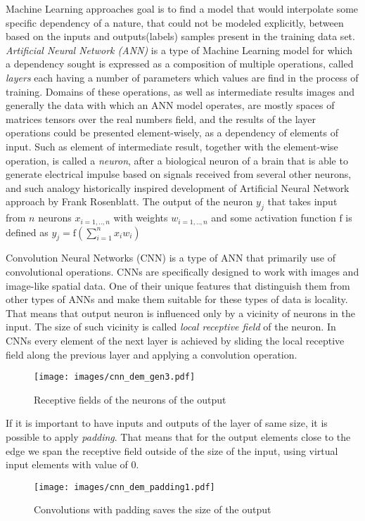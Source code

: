 Machine Learning approaches goal is to find a model that would interpolate some specific dependency of a nature, that could not be modeled explicitly, between based on the inputs and outputs(labels) samples present in the training data set.
\textit{Artificial Neural Network (ANN)} is a type of Machine Learning model for which a dependency sought is expressed as a composition of multiple operations, called \textit{layers} each having a number of parameters which values are find in the process of training.
Domains of these operations, as well as intermediate results images and generally the data with which an ANN model operates, are mostly spaces of matrices tensors over the real numbers field, and the results of the layer operations could be presented element-wisely, as a dependency of elements of input.
Such as element of intermediate result, together with the element-wise operation, is called a \textit{neuron}, after a biological neuron of a brain that is able to generate electrical impulse based on signals received from several other neurons, and such analogy historically inspired development of Artificial Neural Network approach by Frank Rosenblatt\cite{}.
The output of the neuron $y_{j}$ that takes input from $n$ neurons $x_{i=1,..,n}$ with weights $w_{i=1,..,n}$ and some activation function $\mathrm{f}$ is defined as $ y_{j}=\mathrm{f}(\sum_{i=1}^{n} x_{i}w_{i})$
\medskip
{}

Convolution Neural Networks (CNN) is a type of ANN that primarily use of convolutional operations.
CNNs are specifically designed to work with images and image-like spatial data.
One of their unique features that distinguish them from other types of ANNs and make them suitable for these types of data is locality.
That means that output neuron is influenced only by a vicinity of neurons in the input.
The size of such vicinity is called \textit{local receptive field} of the neuron.
In CNNs every element of the next layer is achieved by sliding the local receptive field along the previous layer and applying a convolution operation.
\begin{figure}
	\centering
	\texttt{[image: images/cnn\_dem\_gen3.pdf]}
	\caption{Receptive fields of the neurons of the output}
	\label{fig:rec_field_demo}
\end{figure}

If it is important to have inputs and outputs of the layer of same size, it is possible to apply \textit{padding}.
That means that for the output elements close to the edge we span the receptive field outside of the size of the input, using virtual input elements with value of $0$. 
\begin{figure}
	\centering
	\texttt{[image: images/cnn\_dem\_padding1.pdf]}
	\caption{Convolutions with padding saves the size of the output}
	\label{fig:padding_demo}
\end{figure}
\medskip

